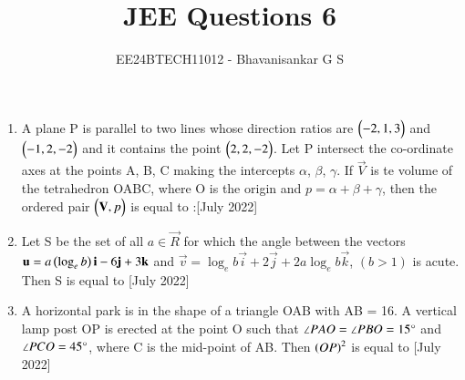\documentclass[journal,12pt,onecolumn]{IEEEtran}
\theoremstyle{remark}
\begin{document}

\vspace{3cm}

\title{JEE Questions 6}
\author{EE24BTECH11012 - Bhavanisankar G S}
\maketitle
\newpage
\bigskip

\renewcommand{\thefigure}{\theenumi}
\renewcommand{\thetable}{\theenumi}
\begin{enumerate}
	\item A plane P is parallel to two lines whose direction ratios are $\begin{pmatrix}-2,1,3\end{pmatrix}$ and $\begin{pmatrix}-1,2,-2\end{pmatrix}$ and it contains the point $\begin{pmatrix}2,2,-2\end{pmatrix}$. Let P intersect the co-ordinate axes at the points A, B, C making the intercepts $\alpha$, $\beta$, $\gamma$. If $\vec{V}$ is te volume of the tetrahedron OABC, where O is the origin and $p=\alpha + \beta + \gamma$, then the ordered pair $\begin{pmatrix}\mathbf{V}, p\end{pmatrix}$ is equal to :\hfill{[July 2022]}
		\begin{enumerate}
		\end{enumerate}
	\item Let S be the set of all $ a \in \vec{R}$ for which the angle between the vectors $\mathbf{u} = a\left(\log_{e}{b}\right)\mathbf{i} -6\mathbf{j} + 3\mathbf{k}$ and $\vec{v} = \log_{e}{b}\vec{i} + 2\vec{j} + 2a\log_{e}{b}\vec{k}$, $(b>1)$ is acute. Then S is equal to \hfill{[July 2022]}
		\begin{enumerate}
				\begin{multicols}{4}
				\item $\brak{-\infty, -\frac{4}{3}}$
				\item $ \phi $
				\item $\brak{-\frac{4}{3}, 0}$
				\item $\brak{\frac{12}{7}, \infty}$
				\end{multicols}
		\end{enumerate}
	\item A horizontal park is in the shape of a triangle OAB with AB = 16. A vertical lamp post OP is erected at the point O such that $\angle{PAO} = \angle{PBO} = 15 \degree$ and $\angle{PCO} = 45\degree$, where C is the mid-point of AB. Then $\left(OP\right)^2$ is equal to \hfill{[July 2022]}

\end{enumerate}
\end{document}
